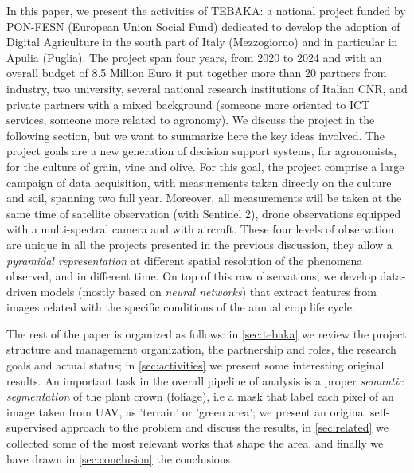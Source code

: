 \documentclass[comsoc,final]{IEEEtran}
\begin{document}
In this paper, we present the activities of \textsc{TEBAKA}: a national project funded by PON-FESN (European Union Social Fund) dedicated to develop the adoption of Digital Agriculture in the south part of Italy (Mezzogiorno) and in particular in Apulia (Puglia). The project span four years, from 2020 to 2024 and with an overall budget of 8.5 Million Euro it put together more than 20 partners from industry, two university, several national research institutions of Italian CNR, and private partners with a mixed background (someone more oriented to ICT services, someone more related to agronomy). 
We discuss the project in the following section, but we want to summarize here the key ideas involved. The project goals are a new generation of decision support systems, for agronomists, for the culture of grain, vine and olive. For this goal, the project comprise a large campaign of data acquisition, with measurements taken directly on the culture and soil, spanning two full year. Moreover, all measurements will be taken at the same time of satellite observation (with Sentinel 2), drone observations equipped with a multi-spectral camera and with aircraft. These four levels of observation are unique in all the projects presented in the previous discussion, they allow a \emph{pyramidal representation} at different spatial resolution of the phenomena observed, and in different time. On top of this raw observations, we develop data-driven models (mostly based on \emph{neural networks}) that extract features from images related with the specific conditions of the annual crop life cycle.

The rest of the paper is organized as follows: in \ref{sec:tebaka} we review the project structure and management organization, the partnership and roles, the research goals and actual status; in \ref{sec:activities} we present some interesting original results. An important task in the overall pipeline of analysis is a proper \emph{semantic segmentation} of the plant crown (foliage), i.e a mask that label each pixel of an image taken from UAV, as 'terrain' or 'green area'; we present an original self-supervised approach to the problem and discuss the results, in \ref{sec:related} we collected some of the most relevant works that shape the area, and finally we have drawn in \ref{sec:conclusion} the conclusions.
\end{document}
